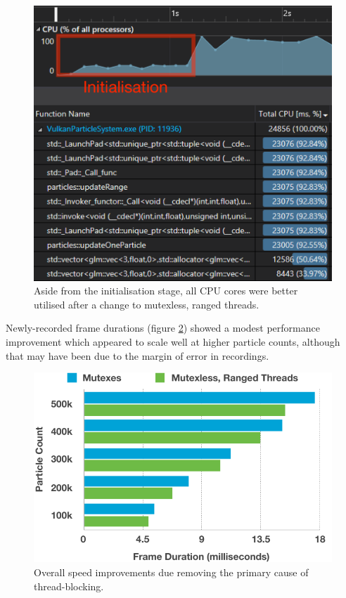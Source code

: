 \documentclass[11pt, a4paper, twocolumn]{article}
\begin{document}
\begin{figure}[h]
\includegraphics[width=\linewidth]{mutexless-diag}
\caption{Aside from the initialisation stage, all CPU cores were better utilised after a change to mutexless, ranged threads.}
\label{fig:mutexless-diag}
\end{figure}

Newly-recorded frame durations (figure \ref{fig:mutexes-rangedthreads}) showed a modest performance improvement which appeared to scale well at higher particle counts, although that may have been due to the margin of error in recordings.

\begin{figure}[h]
\includegraphics[width=\linewidth]{mutexes-rangedthreads}
\caption{Overall speed improvements due removing the primary cause of thread-blocking.}
\label{fig:mutexes-rangedthreads}
\end{figure}
\end{document}
